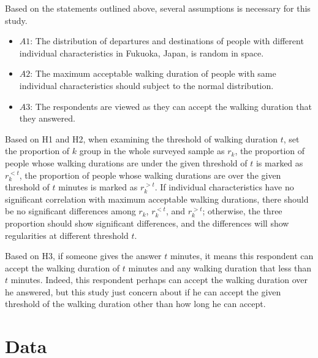 \documentclass[sustainability,article,submit,moreauthors,pdftex,10pt,a4paper]{Definitions/mdpi}
\begin{document}
%
Based on the statements outlined above, several assumptions is necessary for this study.
\begin{itemize}
	\item $A1$: The distribution of departures and destinations of people with different individual characteristics in Fukuoka, Japan, is random in space. 
	
	\item $A2$: The maximum acceptable walking duration of people with same individual characteristics should subject to the normal distribution. 
	
	\item $A3$: The respondents are viewed as they can accept the walking duration that they answered.
\end{itemize}

%
Based on H1 and H2, when examining the threshold of walking duration $t$, set the proportion of $k$ group in the whole surveyed sample as $r_k$, the proportion of people whose walking durations are under the given threshold of $t$ is marked as $r_{k}^{<t}$, the proportion of people whose walking durations are over the given threshold of $t$ minutes is marked as $r_{k}^{>t}$. If individual characteristics have no significant correlation with maximum acceptable walking durations, there should be no significant differences among $r_k$, $r_{k}^{<t}$, and $r_{k}^{>t}$; otherwise, the three proportion should show significant differences, and the differences will show regularities at different threshold $t$.

%
Based on H3, if someone gives the answer $t$ minutes, it means this respondent can accept the walking duration of $t$ minutes and any walking duration that less than $t$ minutes. Indeed, this respondent perhaps can accept the walking duration over he answered, but this study just concern about if he can accept the given threshold of the walking duration other than how long he can accept.

\section{Data}
%
\end{document}
